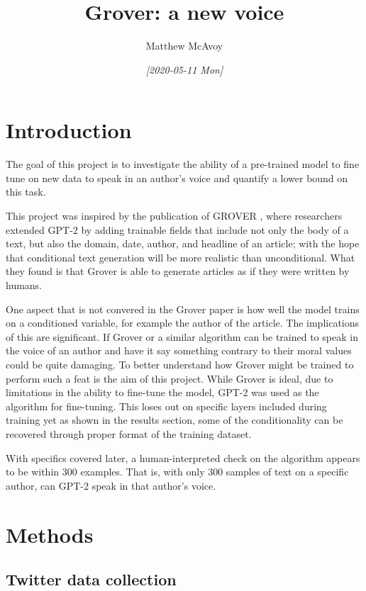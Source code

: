 \documentclass[11pt]{article}
\author{Matthew McAvoy}
\date{\textit{[2020-05-11 Mon]}}
\title{Grover: a new voice}
\begin{document}
\maketitle
\tableofcontents


\section{Introduction}
\label{sec:org8fafbf5}

The goal of this project is to investigate the ability of a pre-trained model to fine 
tune on new data to speak in an author's voice and quantify a lower bound on this task.

This project was inspired by the publication of GROVER \cite{zellers19:_defen_again_neural_fake_news}, 
where researchers extended GPT-2 \cite{radford2019language} by adding trainable fields that include
not only the body of a text, but also the domain, date, author, and headline of an article; with
the hope that conditional text generation will be more realistic than unconditional. What they
found is that Grover is able to generate articles as if they were written by humans.

One aspect that is not convered in the Grover paper is how well the model trains on a conditioned variable, for example
the author of the article. The implications of this are significant. If Grover or a similar algorithm
can be trained to speak in the voice of an author and have it say something contrary to their moral
values could be quite damaging. To better understand how Grover might be trained to perform such a
feat is the aim of this project. While Grover is ideal, due to limitations in the ability to fine-tune
the model, GPT-2 was used as the algorithm for fine-tuning. This loses out on specific layers included
during training yet as shown in the results section, some of the conditionality can be recovered through
proper format of the training dataset.

With specifics covered later, a human-interpreted check on the algorithm appears to be
within 300 examples. That is, with only 300 samples of text on a specific author, can GPT-2 speak in
that author's voice.

\section{Methods}
\label{sec:orgbb79e2b}

\subsection{Twitter data collection}
\label{sec:org2e1f420}
\end{document}
